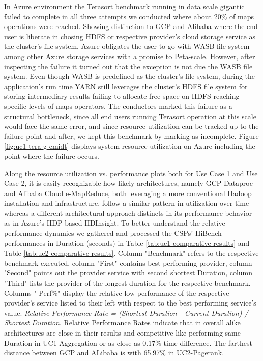 \documentclass[review]{elsarticle}
\begin{document}
In Azure environment the Terasort benchmark running in data scale gigantic failed to complete in all three attempts we conducted where about 20\% of maps operations were reached. Showing distinction to GCP and Alibaba where the end user is liberate in chosing HDFS or respective provider's cloud storage service as the cluster's file system, Azure obligates the user to go with WASB file system among other Azure storage services with a promise to Peta-scale. However, after inspecting the failure it turned out that the exception is not due the WASB file system. Even though WASB is predefined as the cluster's file system, during the application's run time YARN still leverages the cluster's HDFS file system for storing intermediary results failing to allocate free space on HDFS reaching specific levels of maps operators. The conductors marked this failure as a structural bottleneck, since all end users running Terasort operation at this scale would face the same error, and since resource utilization can be tracked up to the failure point and after, we kept this benchmark by marking as incomplete. Figure \ref{fig:uc1-tera-g-cmidt} displays system resource utilization on Azure including the point where the failure occurs.

Along the resource utilization vs. performance plots both for Use Case 1 and Use Case 2, it is easily recognizable how likely architectures, namely GCP Dataproc and Alibaba Cloud e-MapReduce, both leveraging a more conventional Hadoop installation and infrastructure, follow a similar pattern in utilization over time whereas a different architectural approach distincts in its performance behavior as in Azure's HDP based HDInsight. To better understand the relative performance dynamics we gathered and processed the CSPs' HiBench performances in Duration (seconds) in Table \ref{tab:uc1-comparative-results} and Table \ref{tab:uc2-comparative-results}. Column "Benchmark" refers to the respective benchmark executed, column "First" contains best performing provider, column "Second" points out the provider service with second shortest Duration, column "Third" lists the provider of the longest duration for the respective benchmark. Columns "-Perf\%" display the relative low performance of the respective provider's service listed to their left with respect to the best performing service's value. \textit{Relative Performance Rate = (Shortest Duration - Current Duration) / Shortest Duration}. Relative Performance Rates indicate that in overall alike architectures are close in their results and competitive like performing same Duration in UC1-Aggregation or as close as 0.17\% time difference. The farthest distance between GCP and ALibaba is with 65.97\% in UC2-Pagerank. 
\end{document}
